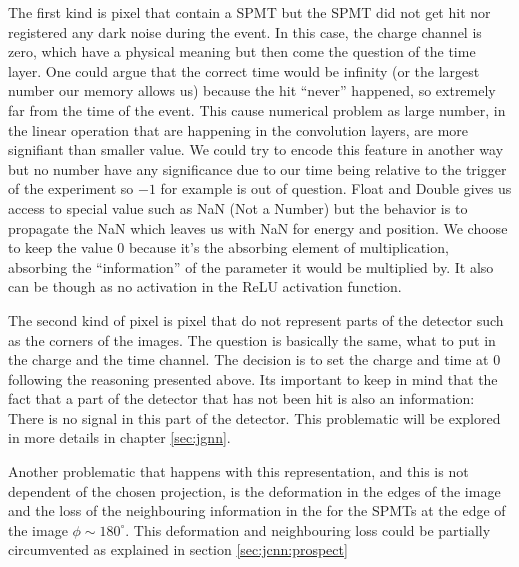 The first kind is pixel that contain a SPMT but the SPMT did not get hit nor registered any dark noise during the event. In this case, the charge channel is zero, which have a physical meaning but then come the question of the time layer. One could argue that the correct time would be infinity (or the largest number our memory allows us) because the hit ``never'' happened, so extremely far from the time of the event. This cause numerical problem as large number, in the linear operation that are happening in the convolution layers, are more signifiant than smaller value. We could try to encode this feature in another way but no number have any significance due to our time being relative to the trigger of the experiment so $-1$ for example is out of question. Float and Double gives us access to special value such as NaN (Not a Number) \cite{noauthor_ieee_2019} but the behavior is to propagate the NaN which leaves us with NaN for energy and position. We choose to keep the value 0 because it's the absorbing element of multiplication, absorbing the ``information'' of the parameter it would be multiplied by. It also can be though as no activation in the ReLU activation function.

The second kind of pixel is pixel that do not represent parts of the detector such as the corners of the images. The question is basically the same, what to put in the charge and the time channel. The decision is to set the charge and time at 0 following the reasoning presented above. Its important to keep in mind that the fact that a part of the detector that has not been hit is also an information: There is no signal in this part of the detector. This problematic will be explored in more details in chapter \ref{sec:jgnn}.

Another problematic that happens with this representation, and this is not dependent of the chosen projection, is the deformation in the edges of the image and the loss of the neighbouring information in the for the SPMTs at the edge of the image $\phi \sim 180^\circ$. This deformation and neighbouring loss could be partially circumvented as explained in section \ref{sec:jcnn:prospect}

